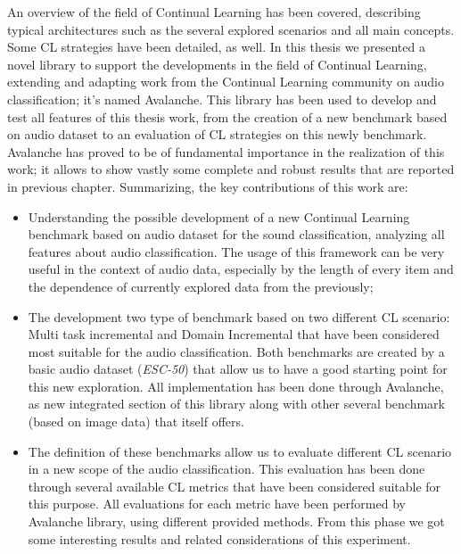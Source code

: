 \documentclass[english, LaM, oneside]{sapthesis}%
\begin{document}
An overview of the field of Continual Learning has been covered, describing typical architectures such as the several explored scenarios and all main concepts. Some CL strategies have been detailed, as well.
\newline \newline
In this thesis we presented a novel library to support the developments in the field of Continual Learning, extending and adapting work from the Continual Learning community on audio classification; it's named Avalanche.
This library has been used to develop and test all features of this thesis work, from the creation of a new benchmark based on audio dataset to an evaluation of CL strategies on this newly benchmark. Avalanche has proved to be of fundamental importance in the realization of this work; it allows to show vastly some complete and robust results that are reported in previous chapter.
\newline \newline
Summarizing, the key contributions of this work are:
\begin{itemize}
    \item Understanding the possible development of a new Continual Learning benchmark based on audio dataset for the sound classification, analyzing all features about audio classification. The usage of this framework can be very useful in the context of audio data, especially  by the length of every item and the dependence of currently explored data from the previously;
    \item The development two type of benchmark based on two different CL scenario: Multi task incremental and Domain Incremental that have been considered  most suitable for the audio classification.  Both benchmarks are created by a basic audio dataset (\textit{ESC-50}) that allow us to have a good starting point for this new exploration.
    All implementation has been done through Avalanche, as new integrated section of this library along with other several benchmark (based on image data) that itself offers.
    \item The definition of these benchmarks allow us to evaluate different CL scenario in a new scope of the audio classification. This evaluation has been done through several available CL metrics that have been considered suitable for this purpose. All evaluations for each metric have been performed by Avalanche library, using different provided methods. From this phase we got some interesting results and related considerations of this experiment.
\end{itemize}
\end{document}

